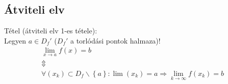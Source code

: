 \documentclass[12pt,a4paper]{scrartcl}
\newenvironment{tetel}{}{}
\begin{document}
\hypertarget{atviteli-elv}{%
\subsection{Átviteli elv}\label{atviteli-elv}}

\begin{tetel}

Tétel (átviteli elv 1-es tétele):\\
Legyen \(a \in D_{f}'\) (\(D_{f}'\) a torlódási pontok halmaza)!
\[\begin{matrix}
{\lim\limits_{x\rightarrow a}f\left( x \right) = b} \\
 \Updownarrow \\
\left. \forall\left( x_{k} \right) \subset D_{f}\backslash\left\{ a \right\}:\lim\left( x_{k} \right) = a\Rightarrow\lim\limits_{k\rightarrow\infty}f\left( x_{k} \right) = b \right. \\
\end{matrix}\]

\end{tetel}
\end{document}
